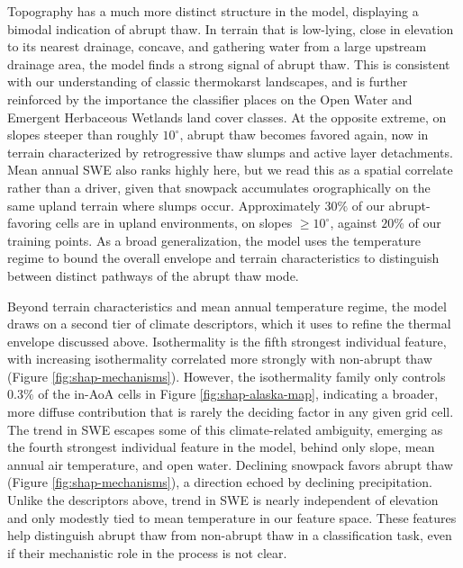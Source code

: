 \documentclass[../main.tex]{subfiles}
\begin{document}
Topography has a much more distinct structure in the model, displaying a bimodal indication of abrupt thaw. In terrain that is low-lying, close in elevation to its nearest drainage, concave, and gathering water from a large upstream drainage area, the model finds a strong signal of abrupt thaw. This is consistent with our understanding of classic thermokarst landscapes, and is further reinforced by the importance the classifier places on the Open Water and Emergent Herbaceous Wetlands land cover classes. At the opposite extreme, on slopes steeper than roughly $10^\circ$, abrupt thaw becomes favored again, now in terrain characterized by retrogressive thaw slumps and active layer detachments. Mean annual SWE also ranks highly here, but we read this as a spatial correlate rather than a driver, given that snowpack accumulates orographically on the same upland terrain where slumps occur. Approximately $30\%$ of our abrupt-favoring cells are in upland environments, on slopes $\geq 10^\circ$, against $20\%$ of our training points. As a broad generalization, the model uses the temperature regime to bound the overall envelope and terrain characteristics to distinguish between distinct pathways of the abrupt thaw mode.

Beyond terrain characteristics and mean annual temperature regime, the model draws on a second tier of climate descriptors, which it uses to refine the thermal envelope discussed above. Isothermality is the fifth strongest individual feature, with increasing isothermality correlated more strongly with non-abrupt thaw (Figure \ref{fig:shap-mechanisms}). However, the isothermality family only controls $0.3\%$ of the in-AoA cells in Figure \ref{fig:shap-alaska-map}, indicating a broader, more diffuse contribution that is rarely the deciding factor in any given grid cell. The trend in SWE escapes some of this climate-related ambiguity, emerging as the fourth strongest individual feature in the model, behind only slope, mean annual air temperature, and open water. Declining snowpack favors abrupt thaw (Figure \ref{fig:shap-mechanisms}), a direction echoed by declining precipitation. Unlike the descriptors above, trend in SWE is nearly independent of elevation and only modestly tied to mean temperature in our feature space. These features help distinguish abrupt thaw from non-abrupt thaw in a classification task, even if their mechanistic role in the process is not clear.
\end{document}
